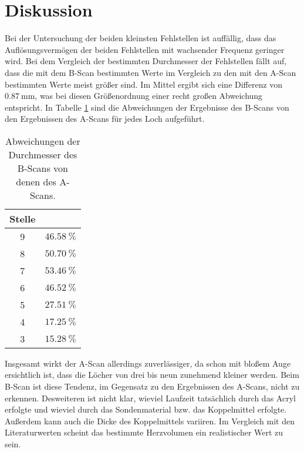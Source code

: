 \section{Diskussion}
\label{sec:Diskussion}

Bei der Untersuchung der beiden kleinsten Fehlstellen ist auffällig, dass das Auflösungsvermögen 
der beiden Fehlstellen mit wachsender Frequenz geringer wird. 
Bei dem Vergleich der bestimmten Durchmesser der Fehlstellen fällt auf, dass die mit dem 
B-Scan bestimmten Werte im Vergleich zu den mit den A-Scan bestimmten Werte meist größer sind. 
Im Mittel ergibt sich eine Differenz von $\SI{0.87}{\milli\meter}$, was bei diesen Größenordnung 
einer recht großen Abweichung entspricht. In Tabelle \ref{tab:Abw} sind die Abweichungen der Ergebnisse des
B-Scans von den Ergebnissen des A-Scans für jedes Loch aufgeführt. 

\begin{table}
\centering
\caption{Abweichungen der Durchmesser des B-Scans von denen des A-Scans.}
\label{tab:Abw}
\begin{tabular}{c c}
\toprule
Stelle & \\
\midrule 
9 & $\SI{46.58}{\percent}$\\
8 & $\SI{50.70}{\percent}$\\
7 & $\SI{53.46}{\percent}$\\
6 & $\SI{46.52}{\percent}$\\
5 & $\SI{27.51}{\percent}$\\
4 & $\SI{17.25}{\percent}$\\
3 & $\SI{15.28}{\percent}$\\
\bottomrule
\end{tabular}
\end{table}


Insgesamt wirkt der A-Scan allerdings zuverlässiger, da schon mit bloßem Auge ersichtlich ist, 
dass die Löcher von drei bis neun zunehmend kleiner werden. Beim B-Scan ist diese Tendenz, 
im Gegensatz zu den Ergebnissen des A-Scans, nicht zu erkennen. 
Desweiteren ist nicht klar, wieviel Laufzeit tatsächlich durch das Acryl erfolgte und wieviel durch 
das Sondenmaterial bzw. das Koppelmittel erfolgte. Außerdem kann auch die Dicke des Koppelmittels 
variiren. 
Im Vergleich mit den Literaturwerten scheint das bestimmte Herzvolumen ein realistischer Wert zu sein. 
